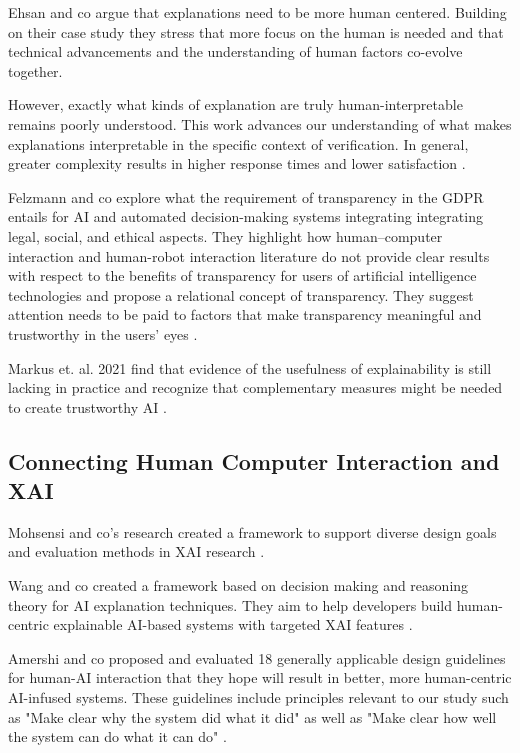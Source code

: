 \documentclass[manuscript,screen,review]{acmart}
\begin{document}
Ehsan and co argue that explanations need to be more human centered.
Building on their case study they stress that more focus on the human is needed and that technical advancements and the understanding of human factors co-evolve together.\cite{Ehsan2020}

However, exactly what kinds of explanation are truly human-interpretable remains poorly understood.
This work advances our understanding of what makes explanations interpretable in the specific context of verification.
In general, greater complexity results in higher response times and lower satisfaction \cite{Narayanan2018}.

Felzmann and co explore what the requirement of transparency in the GDPR entails for AI and automated decision-making systems integrating integrating legal, social, and ethical aspects.
They highlight how human–computer interaction and human-robot interaction literature do not provide clear results with respect to the benefits of transparency for users of artificial intelligence technologies
and propose a relational concept of transparency. 
They suggest attention needs to be paid to factors that make transparency meaningful and trustworthy in the users’ eyes \cite{Felzmann2019}.

Markus et. al. 2021 find that evidence of the usefulness of explainability is still lacking in practice and recognize that complementary measures might be needed to create trustworthy AI \cite{Markus2021}.


\subsection{Connecting Human Computer Interaction and XAI}\label{subsec:human-computer-interaction-focused-xai}

Mohsensi and co's research created a framework to support diverse design goals and evaluation methods in XAI research \cite{Mohseni2021}.

Wang and co created a framework based on decision making and reasoning theory for AI explanation techniques.
They aim to help developers build human-centric explainable AI-based systems with targeted XAI features \cite{Wang2019}.

Amershi and co proposed and evaluated 18 generally applicable design guidelines for human-AI interaction that they hope will result in better, more human-centric AI-infused systems. 
These guidelines include principles relevant to our study such as "Make clear why the system did what it did" as well as "Make clear how well the system can do what it can
do" \cite{Amershi2019}.
\end{document}
